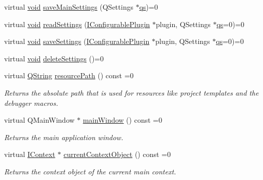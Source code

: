 \begin{DoxyCompactItemize}
virtual \hyperlink{group___u_a_v_objects_plugin_ga444cf2ff3f0ecbe028adce838d373f5c}{void} \hyperlink{group___core_plugin_ga06a863277f61ed94785263617433add1}{save\-Main\-Settings} (Q\-Settings $\ast$\hyperlink{analyze_i_n_s_g_p_s_8m_a620a138c8981e0536c569d7761df4548}{qs})=0
\item 
virtual \hyperlink{group___u_a_v_objects_plugin_ga444cf2ff3f0ecbe028adce838d373f5c}{void} \hyperlink{group___core_plugin_gaba11ef90a574d6fc43e5fefa77f747f5}{read\-Settings} (\hyperlink{class_core_1_1_i_configurable_plugin}{I\-Configurable\-Plugin} $\ast$plugin, Q\-Settings $\ast$\hyperlink{analyze_i_n_s_g_p_s_8m_a620a138c8981e0536c569d7761df4548}{qs}=0)=0
\item 
virtual \hyperlink{group___u_a_v_objects_plugin_ga444cf2ff3f0ecbe028adce838d373f5c}{void} \hyperlink{group___core_plugin_ga1ac91d45ba8e5a39f9e2da76a12a04a6}{save\-Settings} (\hyperlink{class_core_1_1_i_configurable_plugin}{I\-Configurable\-Plugin} $\ast$plugin, Q\-Settings $\ast$\hyperlink{analyze_i_n_s_g_p_s_8m_a620a138c8981e0536c569d7761df4548}{qs}=0)=0
\item 
virtual \hyperlink{group___u_a_v_objects_plugin_ga444cf2ff3f0ecbe028adce838d373f5c}{void} \hyperlink{group___core_plugin_ga2dc9f1b6c02a1af850ca62d9c617f653}{delete\-Settings} ()=0
\item 
virtual \hyperlink{group___u_a_v_objects_plugin_gab9d252f49c333c94a72f97ce3105a32d}{Q\-String} \hyperlink{group___core_plugin_ga1e0dca9dfe2fad0bd3b2d80ce2430f6d}{resource\-Path} () const =0
\begin{DoxyCompactList}\small\item\em Returns the absolute path that is used for resources like project templates and the debugger macros. \end{DoxyCompactList}\item 
virtual Q\-Main\-Window $\ast$ \hyperlink{group___core_plugin_ga7bd137564271d03a3db75c0c71b99ea8}{main\-Window} () const =0
\begin{DoxyCompactList}\small\item\em Returns the main application window. \end{DoxyCompactList}\item 
virtual \hyperlink{class_core_1_1_i_context}{I\-Context} $\ast$ \hyperlink{group___core_plugin_gad6967a507c1b0d7750a8380fc066ca6c}{current\-Context\-Object} () const =0
\begin{DoxyCompactList}\small\item\em Returns the context object of the current main context. \end{DoxyCompactList}\item 

\end{DoxyCompactItemize}
